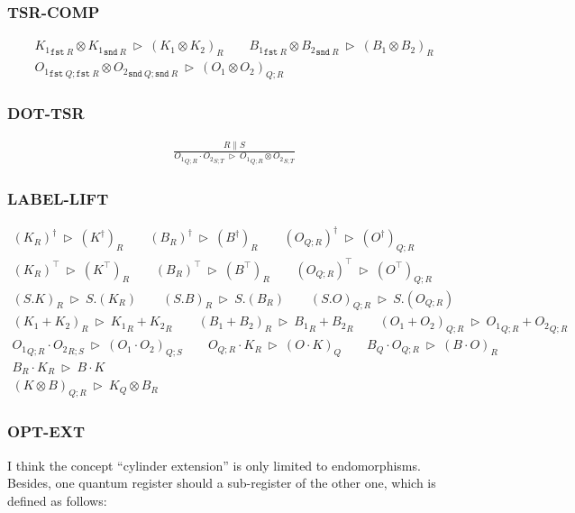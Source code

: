\documentclass[manuscript, review, timestamp]{acmart}
\newcommand*{\fst}{\texttt{fst}}
\newcommand*{\snd}{\texttt{snd}}
\newcommand*{\reduce}{\ \triangleright\ }
\begin{document}
\subsubsection*{\textsf{TSR-COMP}}
\begin{gather*}
  {K_1}_{\fst\ R} \otimes {K_1}_{\snd\ R} \reduce (K_1 \otimes K_2)_{R}
  \qquad
  {B_1}_{\fst\ R} \otimes {B_2}_{\snd\ R} \reduce (B_1 \otimes B_2)_{R} \\
  {O_1}_{\fst\ Q; \fst\ R} \otimes {O_2}_{\snd\ Q; \snd\ R} \reduce (O_1 \otimes O_2)_{Q; R}
\end{gather*}

\subsubsection*{\textsf{DOT-TSR}}
\begin{align*}
  \frac{R \| S}{{O_1}_{Q; R} \cdot {O_2}_{S; T} \reduce {O_1}_{Q; R} \otimes {O_2}_{S; T}}
\end{align*}

\subsubsection*{\textsf{LABEL-LIFT}}
\begin{gather*}
  (K_{R})^\dagger \reduce (K^\dagger)_{R}
  \qquad
  (B_{R})^\dagger \reduce (B^\dagger)_{R}
  \qquad
  (O_{Q; R})^\dagger \reduce (O^\dagger)_{Q; R} \\
  (K_{R})^\top \reduce (K^\top)_{R}
  \qquad
  (B_{R})^\top \reduce (B^\top)_{R}
  \qquad
  (O_{Q; R})^\top \reduce (O^\top)_{Q; R} \\
  (S.K)_{R} \reduce S.(K_{R})
  \qquad
  (S.B)_{R} \reduce S.(B_{R})
  \qquad
  (S.O)_{Q; R} \reduce S.(O_{Q; R}) \\
  (K_1 + K_2)_{R} \reduce {K_1}_{R} + {K_2}_{R}
  \qquad
  (B_1 + B_2)_{R} \reduce {B_1}_{R} + {B_2}_{R}
  \qquad
  (O_1 + O_2)_{Q; R} \reduce {O_1}_{Q; R} + {O_2}_{Q; R}
\end{gather*}
\begin{gather*}
  {O_1}_{Q; R} \cdot {O_2}_{R; S} \reduce (O_1 \cdot O_2)_{Q; S}
  \qquad
  O_{Q; R} \cdot K_{R} \reduce (O \cdot K)_{Q}
  \qquad
  B_{Q} \cdot O_{Q; R} \reduce (B \cdot O)_{R} \\
  B_{R} \cdot K_{R} \reduce B \cdot K \\
  (K \otimes B)_{Q; R} \reduce K_{Q} \otimes B_{R}
\end{gather*}

\subsubsection*{\textsf{OPT-EXT}}
I think the concept ``cylinder extension'' is only limited to endomorphisms. Besides, one quantum register should a sub-register of the other one, which is defined as follows:
\end{document}
